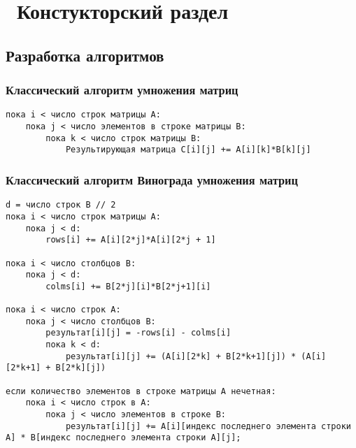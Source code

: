 \chapter{ Констукторский раздел}
\label{cha:design}
\section{ Разработка алгоритмов}

\subsection{ Классический алгоритм умножения матриц}

\begin{lstlisting}[caption={Pseudo code of classic matrix multiplication}]
пока i < число строк матрицы А:
	пока j < число элементов в строке матрицы B:
        пока k < число строк матрицы B:
		    Результирующая матрица C[i][j] += A[i][k]*B[k][j]
\end{lstlisting}	



\subsection{ Классический алгоритм Винограда умножения матриц}

\begin{lstlisting}[caption={Pseudo code of classic Winograd algorithm}]
d = число строк B // 2
пока i < число строк матрицы А:
	пока j < d:
		rows[i] += A[i][2*j]*A[i][2*j + 1]

пока i < число столбцов B:
	пока j < d:
		colms[i] += B[2*j][i]*B[2*j+1][i]

пока i < число строк A:
	пока j < число cтолбцов B:
        результат[i][j] = -rows[i] - colms[i]
        пока k < d:
            результат[i][j] += (A[i][2*k] + B[2*k+1][j]) * (A[i][2*k+1] + B[2*k][j])

если количество элементов в строке матрицы A нечетная:
    пока i < число строк в A:
        пока j < число элементов в строке B:
            результат[i][j] += A[i][индекс последнего элемента строки A] * B[индекс последнего элемента строки A][j];
\end{lstlisting}	



